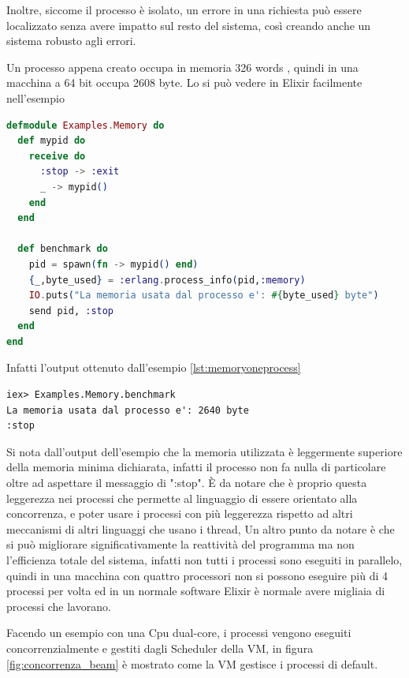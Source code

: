 Inoltre, siccome il processo è isolato, un errore in una richiesta
può essere localizzato senza avere impatto
sul resto del sistema, così creando anche un sistema robusto
agli errori.

Un processo appena creato occupa in memoria 326 words \cite{ErlangPr21:online},
quindi in una macchina a 64 bit occupa 2608 byte.
Lo si può vedere in Elixir facilmente nell'esempio 

\begin{lstlisting}[language=elixir, caption={Memoria in un processo},captionpos=b,
	label={lst:memoryoneprocess}]
defmodule Examples.Memory do
  def mypid do
    receive do
      :stop -> :exit
      _ -> mypid()
    end
  end
 
  def benchmark do
    pid = spawn(fn -> mypid() end)
    {_,byte_used} = :erlang.process_info(pid,:memory)
    IO.puts("La memoria usata dal processo e': #{byte_used} byte")
    send pid, :stop
  end
end
\end{lstlisting}

Infatti l'output ottenuto dall'esempio \ref{lst:memoryoneprocess}
\begin{lstlisting}[language=none]
iex> Examples.Memory.benchmark
La memoria usata dal processo e': 2640 byte
:stop
\end{lstlisting}
	
Si nota dall'output dell'esempio che la memoria utilizzata
è leggermente superiore della memoria minima dichiarata,
infatti il processo non fa nulla di particolare oltre
ad aspettare il messaggio di ":stop".
È da notare che è proprio questa leggerezza nei processi che
permette al linguaggio di essere orientato alla concorrenza,
e poter usare i processi con più leggerezza rispetto
ad altri meccanismi di altri linguaggi che usano i thread,
Un altro punto da notare è che si può migliorare significativamente
la reattività del programma ma non l'efficienza totale del
sistema, infatti non tutti i processi
sono eseguiti in parallelo, quindi in una macchina con quattro
processori non si possono eseguire più di 4 processi per volta
ed in un normale software Elixir è normale avere migliaia di
processi che lavorano.

Facendo un esempio con una Cpu dual-core,
i processi vengono eseguiti concorrenzialmente e gestiti
dagli Scheduler della VM,
in figura \ref{fig:concorrenza_beam} è mostrato come
la VM gestisce i processi di default.

